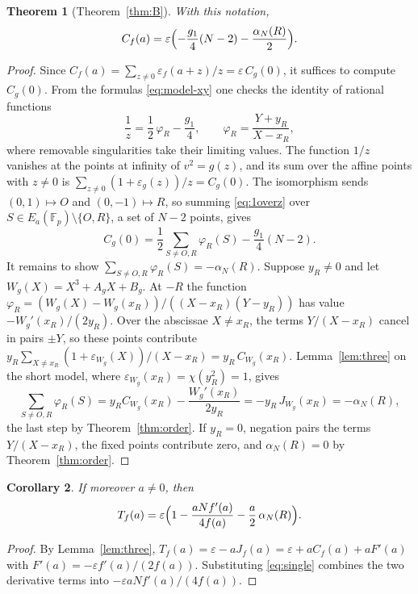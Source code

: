 \documentclass[11pt,a4paper]{article}
\numberwithin{equation}{section}
\theoremstyle{plain}
\newtheorem{theorem}{Theorem}[section]
\newtheorem{corollary}[theorem]{Corollary}
\theoremstyle{definition}
\newcommand{\F}{\mathbb{F}}
\newcommand{\eps}{\varepsilon}
\begin{document}
\begin{theorem}[Theorem~\ref{thm:B}]\label{thm:single}
With this notation,
\begin{equation}\label{eq:single}
C_f(a)=\eps\Bigl(-\frac{g_1}{4}(N-2)-\frac{\alpha_N(R)}{2}\Bigr).
\end{equation}
\end{theorem}

\begin{proof}
Since $C_f(a)=\sum_{z\neq0}\eps_f(a+z)/z=\eps\,C_g(0)$, it suffices to compute $C_g(0)$. From the formulas \eqref{eq:model-xy} one checks the identity of rational functions
\begin{equation}\label{eq:1overz}
\frac1z=\frac12\,\varphi_R-\frac{g_1}{4},\qquad \varphi_R=\frac{Y+y_R}{X-x_R},
\end{equation}
where removable singularities take their limiting values. The function $1/z$ vanishes at the points at infinity of $v^2=g(z)$, and its sum over the affine points with $z\neq0$ is $\sum_{z\neq0}(1+\eps_g(z))/z=C_g(0)$. The isomorphism sends $(0,1)\mapsto O$ and $(0,-1)\mapsto R$, so summing \eqref{eq:1overz} over $S\in E_a(\F_p)\setminus\{O,R\}$, a set of $N-2$ points, gives
\[
C_g(0)=\frac12\sum_{S\neq O,R}\varphi_R(S)-\frac{g_1}{4}(N-2).
\]
It remains to show $\sum_{S\neq O,R}\varphi_R(S)=-\alpha_N(R)$. Suppose $y_R\neq0$ and let $W_g(X)=X^3+A_gX+B_g$. At $-R$ the function $\varphi_R=(W_g(X)-W_g(x_R))/((X-x_R)(Y-y_R))$ has value $-W_g'(x_R)/(2y_R)$. Over the abscissae $X\neq x_R$, the terms $Y/(X-x_R)$ cancel in pairs $\pm Y$, so these points contribute $y_R\sum_{X\neq x_R}(1+\eps_{W_g}(X))/(X-x_R)=y_R\,C_{W_g}(x_R)$. Lemma~\ref{lem:three} on the short model, where $\eps_{W_g}(x_R)=\chi(y_R^2)=1$, gives
\[
\sum_{S\neq O,R}\varphi_R(S)=y_RC_{W_g}(x_R)-\frac{W_g'(x_R)}{2y_R}=-y_R\,J_{W_g}(x_R)=-\alpha_N(R),
\]
the last step by Theorem~\ref{thm:order}. If $y_R=0$, negation pairs the terms $Y/(X-x_R)$, the fixed points contribute zero, and $\alpha_N(R)=0$ by Theorem~\ref{thm:order}.
\end{proof}

\begin{corollary}\label{cor:truncation}
If moreover $a\neq0$, then
\begin{equation}\label{eq:truncation}
T_f(a)=\eps\Bigl(1-\frac{aN f'(a)}{4f(a)}-\frac a2\,\alpha_N(R)\Bigr).
\end{equation}
\end{corollary}

\begin{proof}
By Lemma~\ref{lem:three}, $T_f(a)=\eps-aJ_f(a)=\eps+aC_f(a)+aF'(a)$ with $F'(a)=-\eps f'(a)/(2f(a))$. Substituting \eqref{eq:single} combines the two derivative terms into $-\eps aNf'(a)/(4f(a))$.
\end{proof}
\end{document}
